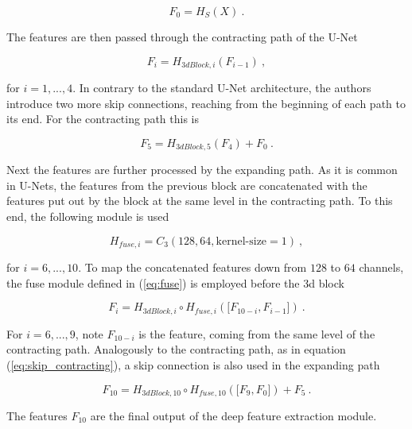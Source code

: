     $$ F_0 = H_S(X) ~. $$

The features are then passed through the contracting path of the U-Net

    $$F_{i} = H_{3dBlock, i}(F_{i-1}) ~,$$

for $i = 1, ..., 4$. In contrary to the standard U-Net architecture,
the authors introduce two more skip connections, 
reaching from the beginning of each path to its end.
For the contracting path this is

    \begin{equation} \label{eq:skip_contracting}
        F_{5} = H_{3dBlock, 5}(F_4) + F_0 ~.
    \end{equation}

Next the features are further processed by the expanding path.
As it is common in U-Nets, 
the features from the previous block are concatenated with the features put out by the block at the same level in the contracting path.
To this end, the following module is used

\begin{equation} \label{eq:fuse}
    H_{fuse, i} = C_3(128, 64, \text{kernel-size}=1) ~,
\end{equation}

for $i=6, ..., 10$.
To map the concatenated features down from $128$ to $64$ channels, 
the fuse module defined in (\ref{eq:fuse}) is employed before the 3d block

    $$F_{i} = H_{3dBlock, i} \circ H_{fuse, i} \left( \big[F_{10 - i}, F_{i-1} \big] \right) ~.$$

For $i = 6, ..., 9$, note $F_{10 - i}$ is the feature, coming from the same level of the contracting path.
Analogously to the contracting path, as in equation (\ref{eq:skip_contracting}),
a skip connection is also used in the expanding path

    $$ F_{10} = H_{3dBlock, 10} \circ H_{fuse, 10} \left( \big[F_{9}, F_0 \big] \right) + F_5 ~. $$

The features $F_{10}$ are the final output of the deep feature extraction module.